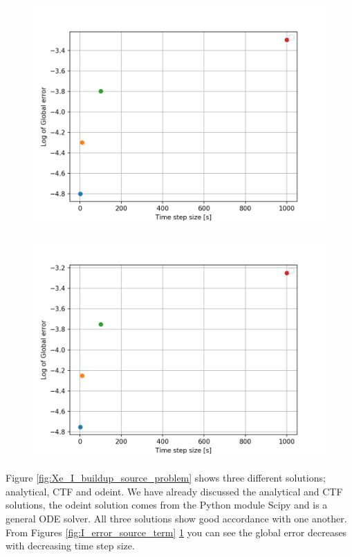 \begin{figure}[ht] 
\centering
\begin{minipage}{.5\textwidth}
  \centering
  \includegraphics[width=.9\linewidth]{images/IError.png}
  \label{fig:I_error_source_term}
\end{minipage}%
\begin{minipage}{.5\textwidth}
  \centering
  \includegraphics[width=.9\linewidth]{images/XeError.png}
  \label{fig:Xe_error_source_term}
\end{minipage}
\end{figure}

Figure \ref{fig:Xe_I_buildup_source_problem} shows three different solutions; analytical, CTF and odeint. We have already discussed the analytical and CTF solutions, the odeint solution comes from the Python module Scipy and is a general ODE solver. All three solutions show good accordance with one another. From Figures \ref{fig:I_error_source_term} \ref{fig:Xe_error_source_term} you can see the global error decreases with decreasing time step size. 

